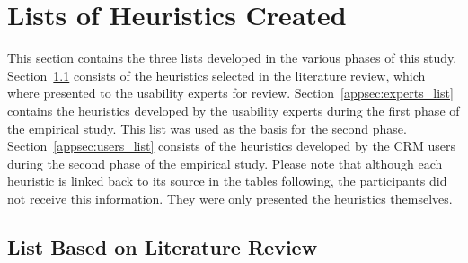 \chapter{Lists of Heuristics Created}
This section contains the three lists developed in the various phases of this study. Section~\ref{appsec:litrev_list} consists of the heuristics selected in the literature review, which where presented to the usability experts for review. Section~\ref{appsec:experts_list} contains the heuristics developed by the usability experts during the first phase of the empirical study. This list was used as the basis for the second phase. Section~\ref{appsec:users_list} consists of the heuristics developed by the CRM users during the second phase of the empirical study. Please note that although each heuristic is linked back to its source in the tables following, the participants did not receive this information. They were only presented the heuristics themselves.

\section{List Based on Literature Review}
\label{appsec:litrev_list}

